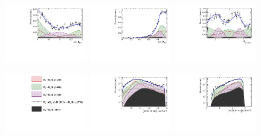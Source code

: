 \begin{figure}[h]
		\includegraphics[width=0.32\textwidth, height = !]{figs/lassoFit/LASSO/h_cosTheta_Kpi_mod.pdf} 
		\includegraphics[width=0.32\textwidth, height = !]{figs/lassoFit/LASSO/h_cosTheta_Dspi_mod.pdf} 
		\includegraphics[width=0.32\textwidth, height = !]{figs/lassoFit/LASSO/h_phi_Kpi_Dspi_mod.pdf} 

		\caption{} 		
	\centering
		\includegraphics[width=0.32\textwidth, height = !]{figs/lassoFit/LASSO/leg.pdf} 
		\includegraphics[width=0.32\textwidth, height = !]{figs/lassoFit/LASSO/m_Kpipi_mod_log.pdf} 
		\includegraphics[width=0.32\textwidth, height = !]{figs/lassoFit/LASSO/m_Dspipi_mod_log.pdf} 


\end{figure}
